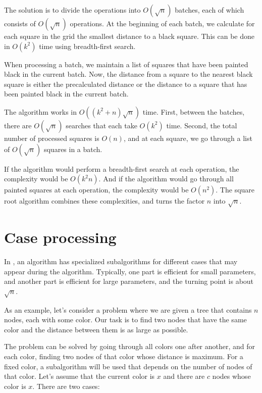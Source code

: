 The solution is to divide the operations into
$O(\sqrt n)$ batches, each of which consists
of $O(\sqrt n)$ operations.
At the beginning of each batch,
we calculate for each square in the grid
the smallest distance to a black square.
This can be done in $O(k^2)$ time using breadth-first search.

When processing a batch, we maintain a list of squares
that have been painted black in the current batch.
Now, the distance from a square to the nearest black
square is either the precalculated distance or the distance
to a square that has been painted black in the current batch.

The algorithm works in
$O((k^2+n) \sqrt n)$ time.
First, between the batches,
there are $O(\sqrt n)$ searches that each take
$O(k^2)$ time.
Second, the total number of processed
squares is $O(n)$, and at each square,
we go through a list of $O(\sqrt n)$ squares
in a batch.

If the algorithm would perform a breadth-first search
at each operation, the complexity would be
$O(k^2 n)$.
And if the algorithm would go through all painted
squares at each operation,
the complexity would be $O(n^2)$.
The square root algorithm combines these complexities,
and turns the factor $n$ into $\sqrt n$.

\section{Case processing}


In , an algorithm has
specialized subalgorithms for different cases that
may appear during the algorithm.
Typically, one part is efficient for
small parameters, and another part is efficient
for large parameters, and the turning point is
about $\sqrt n$.

As an example, let's consider a problem where
we are given a tree that contains $n$ nodes,
each with some color. Our task is to find two nodes
that have the same color and the distance
between them is as large as possible.

The problem can be solved by going through all
colors one after another, and for each color,
finding two nodes of that color whose distance is
maximum.
For a fixed color, a subalgorithm will be used
that depends on the number of nodes of that color.
Let's assume that the current color is $x$
and there are $c$ nodes whose color is $x$.
There are two cases:

